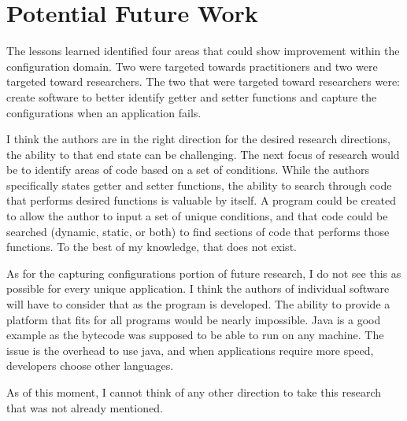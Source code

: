 \documentclass[conference]{IEEEtran}
\begin{document}
\section{Potential Future Work}
The lessons learned identified four areas that could show improvement within the configuration domain. Two were targeted towards practitioners and two were targeted toward researchers. The two that were targeted toward researchers were: create software to better identify getter and setter functions and capture the configurations when an application fails.

I think the authors are in the right direction for the desired research directions, the ability to that end state can be challenging. The next focus of research would be to identify areas of code based on a set of conditions. While the authors specifically states getter and setter functions, the ability to search through code that performs desired functions is valuable by itself. A program could be created to allow the author to input a set of unique conditions, and that code could be searched (dynamic, static, or both) to find sections of code that performs those functions. To the best of my knowledge, that does not exist. 

As for the capturing configurations portion of future research, I do not see this as possible for every unique application. I think the authors of individual software will have to consider that as the program is developed. The ability to provide a platform that fits for all programs would be nearly impossible. Java is a good example as the bytecode was supposed to be able to run on any machine. The issue is the overhead to use java, and when applications require more speed, developers choose other languages. 

As of this moment, I cannot think of any other direction to take this research that was not already mentioned. 
 

%
%


\end{document}

